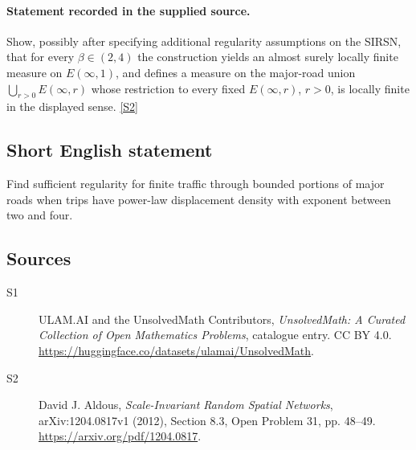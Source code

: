 \documentclass[11pt]{article}
\newcommand{\sref}[2]{\hyperlink{source:#1:#2}{[S#2]}}
\begin{document}
\paragraph{Statement recorded in the supplied source.}
Show, possibly after specifying additional regularity assumptions on the SIRSN, that for every $\beta\in(2,4)$ the construction yields an almost surely locally finite measure on $E(\infty,1)$, and defines a measure on the major-road union $\bigcup_{r>0}E(\infty,r)$ whose restriction to every fixed $E(\infty,r)$, $r>0$, is locally finite in the displayed sense. \sref{statement}{2}
\subsection{Short English statement}
Find sufficient regularity for finite traffic through bounded portions of major roads when trips have power-law displacement density with exponent between two and four.
\subsection{Sources}
\begin{description}
\item[\hypertarget{source:statement:1}{S1}] ULAM.AI and the UnsolvedMath Contributors, \emph{UnsolvedMath: A Curated Collection of Open Mathematics Problems}, catalogue entry. CC BY 4.0. \url{https://huggingface.co/datasets/ulamai/UnsolvedMath}.
\item[\hypertarget{source:statement:2}{S2}] David J. Aldous, \emph{Scale-Invariant Random Spatial Networks}, arXiv:1204.0817v1 (2012), Section 8.3, Open Problem 31, pp. 48--49. \url{https://arxiv.org/pdf/1204.0817}.
\end{description}
\label{end:statement}
\end{document}
